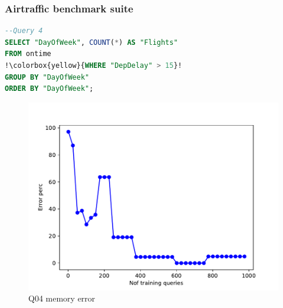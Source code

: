 \begin{frame}[fragile]
\frametitle{Airtraffic benchmark suite}
\begin{lstlisting}[basicstyle=\ttfamily\footnotesize, language=SQL,escapechar=!]
--Query 4
SELECT "DayOfWeek", COUNT(*) AS "Flights"
FROM ontime
!\colorbox{yellow}{WHERE "DepDelay" > 15}!
GROUP BY "DayOfWeek"
ORDER BY "DayOfWeek";
\end{lstlisting}
	\begin{figure}[!htb]
		\centering
	  \includegraphics[scale=0.4]{../figs/airtraffic/airtraffic_q04_memerror.pdf}
	  \caption{Q04 memory error}
	    \label{fig:mem04}
	\end{figure}
\end{frame}


